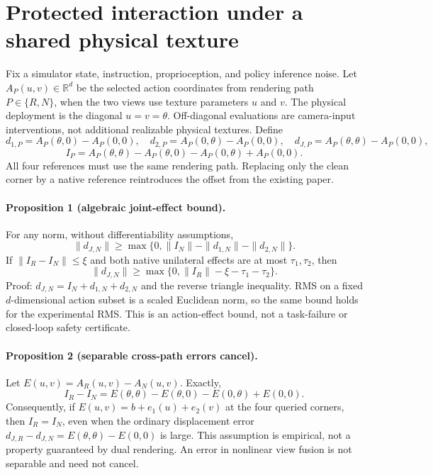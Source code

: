 \section*{Protected interaction under a shared physical texture}
Fix a simulator state, instruction, proprioception, and policy inference noise.
Let $A_P(u,v)\in\mathbb R^d$ be the selected action coordinates from rendering
path $P\in\{R,N\}$, when the two views use texture parameters $u$ and $v$.
The physical deployment is the diagonal $u=v=\theta$. Off-diagonal evaluations
are camera-input interventions, not additional realizable physical textures.
Define
\[
 d_{1,P}=A_P(\theta,0)-A_P(0,0),\quad
 d_{2,P}=A_P(0,\theta)-A_P(0,0),\quad
 d_{J,P}=A_P(\theta,\theta)-A_P(0,0),
\]
\[
 I_P=A_P(\theta,\theta)-A_P(\theta,0)-A_P(0,\theta)+A_P(0,0).
\]
All four references must use the same rendering path. Replacing only the clean
corner by a native reference reintroduces the offset from the existing paper.

\paragraph{Proposition 1 (algebraic joint-effect bound).}
For any norm, without differentiability assumptions,
\[
 \|d_{J,N}\|\ge\max\{0,\|I_N\|-\|d_{1,N}\|-\|d_{2,N}\|\}.
\]
If $\|I_R-I_N\|\le\xi$ and both native unilateral effects are at most
$\tau_1,\tau_2$, then
\[
 \|d_{J,N}\|\ge\max\{0,\|I_R\|-\xi-\tau_1-\tau_2\}.
\]
Proof: $d_{J,N}=I_N+d_{1,N}+d_{2,N}$ and the reverse triangle inequality.
RMS on a fixed $d$-dimensional action subset is a scaled Euclidean norm, so the
same bound holds for the experimental RMS. This is an action-effect bound,
not a task-failure or closed-loop safety certificate.

\paragraph{Proposition 2 (separable cross-path errors cancel).}
Let $E(u,v)=A_R(u,v)-A_N(u,v)$. Exactly,
\[
 I_R-I_N=E(\theta,\theta)-E(\theta,0)-E(0,\theta)+E(0,0).
\]
Consequently, if $E(u,v)=b+e_1(u)+e_2(v)$ at the four queried corners, then
$I_R=I_N$, even when the ordinary displacement error
$d_{J,R}-d_{J,N}=E(\theta,\theta)-E(0,0)$ is large.
This assumption is empirical, not a property guaranteed by dual rendering.
An error in nonlinear view fusion is not separable and need not cancel.

